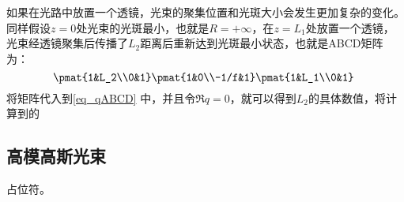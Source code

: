 如果在光路中放置一个透镜，光束的聚集位置和光斑大小会发生更加复杂的变化。同样假设$z=0$处光束的光斑最小，也就是$R=+\infty$，在$z=L_1$处放置一个透镜，光束经透镜聚集后传播了$L_2$距离后重新达到光斑最小状态，也就是ABCD矩阵为：
\begin{equation}
\pmat{1&L_2\\0&1}\pmat{1&0\\-1/f&1}\pmat{1&L_1\\0&1}~
\end{equation}
将矩阵代入到\autoref{eq_qABCD} 中，并且令$\Re{q}=0$，就可以得到$L_2$的具体数值，将计算到的$$

\subsection{高模高斯光束}
占位符。
